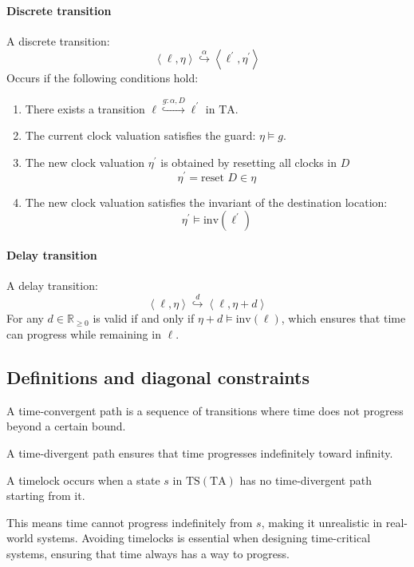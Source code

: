 \paragraph*{Discrete transition}
A discrete transition:
\[\left\langle \ell,\eta\right\rangle\overset{\alpha}{\hookrightarrow}\left\langle \ell^\prime,\eta^\prime\right\rangle\] 
Occurs if the following conditions hold:
\begin{enumerate}
    \item There exists a transition $\ell\overset{g:\alpha,D}{\hookrightarrow}\ell^\prime$ in $\text{TA}$. 
    \item The current clock valuation satisfies the guard: $\eta\models g$. 
    \item The new clock valuation $\eta^\prime$ is obtained by resetting all clocks in $D$
        \[\eta^\prime=\text{reset }D \in \eta\]
    \item The new clock valuation satisfies the invariant of the destination location: 
        \[\eta^\prime\models\text{inv}(\ell^\prime)\]
\end{enumerate}

\paragraph*{Delay transition}
A delay transition:
\[\left\langle \ell,\eta\right\rangle\overset{d}{\hookrightarrow}\left\langle \ell,\eta+d\right\rangle\] 
For any $d\in\mathbb{R}_{\geq 0}$ is valid if and only if $\eta+d\models\text{inv}(\ell)$, which ensures that time can progress while remaining in $\ell$.

\subsection{Definitions and diagonal constraints}
\begin{definition}
    A time-convergent path is a sequence of transitions where time does not progress beyond a certain bound.
\end{definition}
\noindent A time-divergent path ensures that time progresses indefinitely toward infinity.
\begin{definition}
    A timelock occurs when a state $s$ in $\text{TS}(\text{TA})$ has no time-divergent path starting from it.
\end{definition}
\noindent This means time cannot progress indefinitely from $s$, making it unrealistic in real-world systems.
Avoiding timelocks is essential when designing time-critical systems, ensuring that time always has a way to progress.

